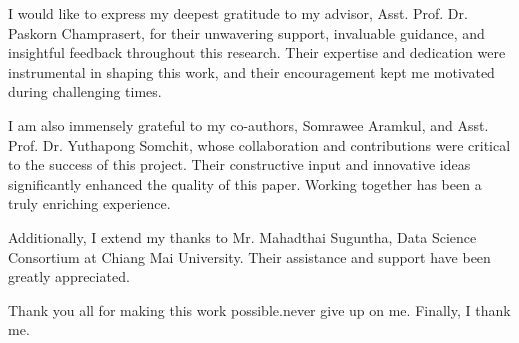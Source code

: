 \begin{Acknowledgement}
I would like to express my deepest gratitude to my advisor, Asst. Prof. Dr. Paskorn Champrasert, for their unwavering support, invaluable guidance, and insightful feedback throughout this research. Their expertise and dedication were instrumental in shaping this work, and their encouragement kept me motivated during challenging times.

I am also immensely grateful to my co-authors, Somrawee Aramkul, and Asst. Prof. Dr. Yuthapong Somchit, whose collaboration and contributions were critical to the success of this project. Their constructive input and innovative ideas significantly enhanced the quality of this paper. Working together has been a truly enriching experience.

Additionally, I extend my thanks to Mr. Mahadthai Suguntha, Data Science Consortium at Chiang Mai University. Their assistance and support have been greatly appreciated.

Thank you all for making this work possible.never give up on me. Finally, I thank me. 






\end{Acknowledgement}